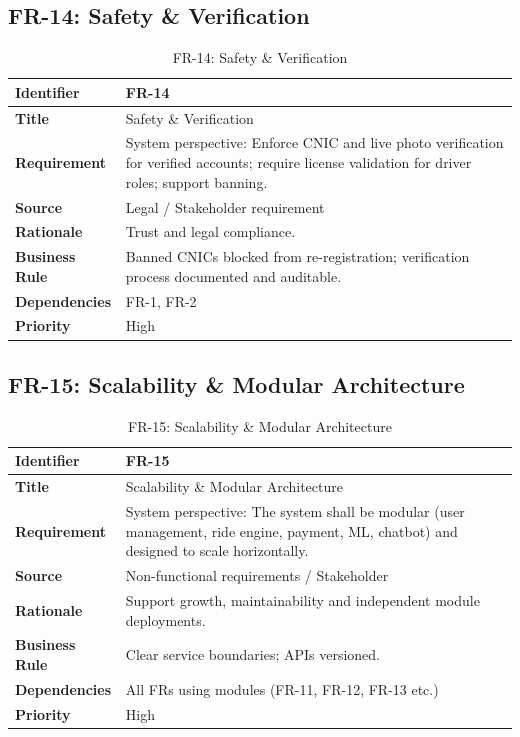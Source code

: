 \subsection{FR-14: Safety \& Verification}

\begin{longtable}{|p{3cm}|p{12cm}|}
\caption{FR-14: Safety \& Verification}
\label{tab:fr-14} \\
\hline
\rowcolor{lightgray!30}
\textbf{Identifier} & FR-14 \\
\hline
\textbf{Title} & Safety \& Verification \\
\hline
\textbf{Requirement} & System perspective: Enforce CNIC and live photo verification for verified accounts; require license validation for driver roles; support banning. \\
\hline
\textbf{Source} & Legal / Stakeholder requirement \\
\hline
\textbf{Rationale} & Trust and legal compliance. \\
\hline
\textbf{Business Rule} & Banned CNICs blocked from re-registration; verification process documented and auditable. \\
\hline
\textbf{Dependencies} & FR-1, FR-2 \\
\hline
\textbf{Priority} & High \\
\hline
\end{longtable}

\subsection{FR-15: Scalability \& Modular Architecture}

\begin{longtable}{|p{3cm}|p{12cm}|}
\caption{FR-15: Scalability \& Modular Architecture}
\label{tab:fr-15} \\
\hline
\rowcolor{lightgray!30}
\textbf{Identifier} & FR-15 \\
\hline
\textbf{Title} & Scalability \& Modular Architecture \\
\hline
\textbf{Requirement} & System perspective: The system shall be modular (user management, ride engine, payment, ML, chatbot) and designed to scale horizontally. \\
\hline
\textbf{Source} & Non-functional requirements / Stakeholder \\
\hline
\textbf{Rationale} & Support growth, maintainability and independent module deployments. \\
\hline
\textbf{Business Rule} & Clear service boundaries; APIs versioned. \\
\hline
\textbf{Dependencies} & All FRs using modules (FR-11, FR-12, FR-13 etc.) \\
\hline
\textbf{Priority} & High \\
\hline
\end{longtable}

